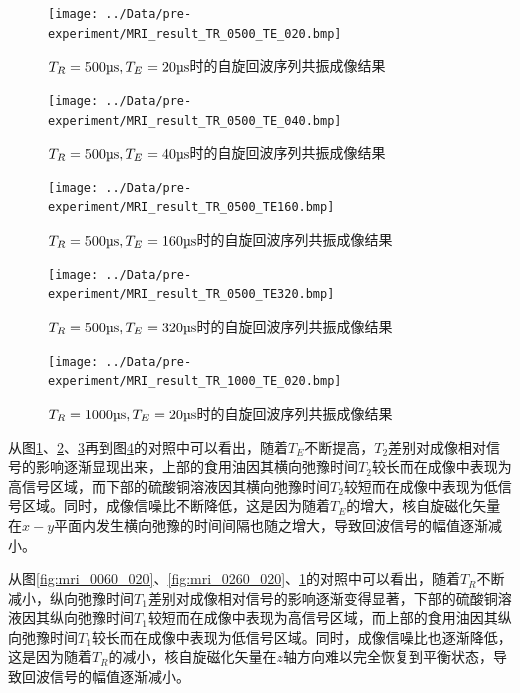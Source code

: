 \documentclass{thuemp}
\begin{document}
\begin{figure}[H]
    \centering
    \texttt{[image: ../Data/pre-experiment/MRI\_result\_TR\_0500\_TE\_020.bmp]}
    \caption{$T_R = \text{\si{500 \micro\second}}, T_E = \text{\si{20 \micro\second}}$时的自旋回波序列共振成像结果}
    \label{fig:mri_0500_020}
\end{figure}

\begin{figure}[H]
    \centering
    \texttt{[image: ../Data/pre-experiment/MRI\_result\_TR\_0500\_TE\_040.bmp]}
    \caption{$T_R = \text{\si{500 \micro\second}}, T_E = \text{\si{40 \micro\second}}$时的自旋回波序列共振成像结果}
    \label{fig:mri_0500_040}
\end{figure}

\begin{figure}[H]
    \centering
    \texttt{[image: ../Data/pre-experiment/MRI\_result\_TR\_0500\_TE160.bmp]}
    \caption{$T_R = \text{\si{500 \micro\second}}, T_E = \text{\si{160 \micro\second}}$时的自旋回波序列共振成像结果}
    \label{fig:mri_0500_160}
\end{figure}

\begin{figure}[H]
    \centering
    \texttt{[image: ../Data/pre-experiment/MRI\_result\_TR\_0500\_TE320.bmp]}
    \caption{$T_R = \text{\si{500 \micro\second}}, T_E = \text{\si{320 \micro\second}}$时的自旋回波序列共振成像结果}
    \label{fig:mri_0500_320}
\end{figure}

\begin{figure}[H]
    \centering
    \texttt{[image: ../Data/pre-experiment/MRI\_result\_TR\_1000\_TE\_020.bmp]}
    \caption{$T_R = \text{\si{1000 \micro\second}}, T_E = \text{\si{20 \micro\second}}$时的自旋回波序列共振成像结果}
    \label{fig:mri_1000_020}
\end{figure}

从图\ref{fig:mri_0500_020}、\ref{fig:mri_0500_040}、\ref{fig:mri_0500_160}再到图\ref{fig:mri_0500_320}的对照中可以看出，随着$T_E$不断提高，$T_2$差别对成像相对信号的影响逐渐显现出来，上部的食用油因其横向弛豫时间$T_2$较长而在成像中表现为高信号区域，而下部的硫酸铜溶液因其横向弛豫时间$T_2$较短而在成像中表现为低信号区域。同时，成像信噪比不断降低，这是因为随着$T_E$的增大，核自旋磁化矢量在$x-y$平面内发生横向弛豫的时间间隔也随之增大，导致回波信号的幅值逐渐减小。

从图\ref{fig:mri_0060_020}、\ref{fig:mri_0260_020}、\ref{fig:mri_0500_020}的对照中可以看出，随着$T_R$不断减小，纵向弛豫时间$T_1$差别对成像相对信号的影响逐渐变得显著，下部的硫酸铜溶液因其纵向弛豫时间$T_1$较短而在成像中表现为高信号区域，而上部的食用油因其纵向弛豫时间$T_1$较长而在成像中表现为低信号区域。同时，成像信噪比也逐渐降低，这是因为随着$T_R$的减小，核自旋磁化矢量在$z$轴方向难以完全恢复到平衡状态，导致回波信号的幅值逐渐减小。
\end{document}
